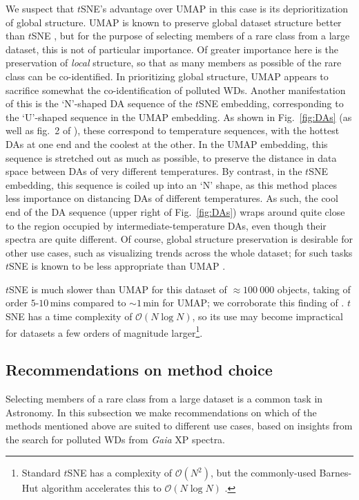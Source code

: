 \documentclass[fleqn,usenatbib]{rasti}
\begin{document}
We suspect that $t$SNE's advantage over UMAP in this case is its deprioritization of global structure.
UMAP is known to preserve global dataset structure better than $t$SNE \citep{mcinnes18, fotopoulou24}, but for the purpose of selecting members of a rare class from a large dataset, this is not of particular importance.
Of greater importance here is the preservation of \textit{local} structure, so that as many members as possible of the rare class can be co-identified.
In prioritizing global structure, UMAP appears to sacrifice somewhat the co-identification of polluted WDs.
Another manifestation of this is the `N'-shaped DA sequence of the $t$SNE embedding, corresponding to the `U'-shaped sequence in the UMAP embedding.
As shown in Fig.~\ref{fig:DAs} (as well as fig.~2 of \citealt{kao24}), these correspond to temperature sequences, with the hottest DAs at one end and the coolest at the other.
In the UMAP embedding, this sequence is stretched out as much as possible, to preserve the distance in data space between DAs of very different temperatures.
By contrast, in the $t$SNE embedding, this sequence is coiled up into an `N' shape, as this method places less importance on distancing DAs of different temperatures.
As such, the cool end of the DA sequence (upper right of Fig.~\ref{fig:DAs}) wraps around quite close to the region occupied by intermediate-temperature DAs, even though their spectra are quite different.
Of course, global structure preservation is desirable for other use cases, such as visualizing trends across the whole dataset; for such tasks $t$SNE is known to be less appropriate than UMAP \citep{mcinnes18}.

$t$SNE is much slower than UMAP for this dataset of $\approx 100~000$ objects, taking of order $5\text{-}10\,\text{mins}$ compared to $\sim1\,\text{min}$ for UMAP; we corroborate this finding of \citet{kao24}.
$t$SNE has a time complexity of $\mathcal{O}(N \log N)$, so its use may become impractical for datasets a few orders of magnitude larger\footnote{
    Standard $t$SNE has a complexity of $\mathcal{O}(N^2)$, but the commonly-used Barnes-Hut algorithm \citep{barnes86} accelerates this to $\mathcal{O}(N\log N)$ \citep{vandermaaten13}.
}.


\subsection{Recommendations on method choice}

Selecting members of a rare class from a large dataset is a common task in Astronomy.
In this subsection we make recommendations on which of the methods mentioned above are suited to different use cases, based on insights from the search for polluted WDs from \textit{Gaia} XP spectra.
\end{document}
